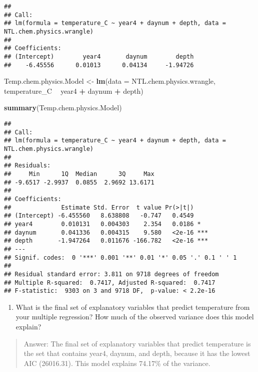 \documentclass[]{article}
\newenvironment{Shaded}{\begin{snugshade}}{\end{snugshade}}
\newcommand{\KeywordTok}[1]{\textcolor[rgb]{0.13,0.29,0.53}{\textbf{#1}}}
\newcommand{\DataTypeTok}[1]{\textcolor[rgb]{0.13,0.29,0.53}{#1}}
\newcommand{\StringTok}[1]{\textcolor[rgb]{0.31,0.60,0.02}{#1}}
\newcommand{\OperatorTok}[1]{\textcolor[rgb]{0.81,0.36,0.00}{\textbf{#1}}}
\newcommand{\NormalTok}[1]{#1}
\providecommand{\tightlist}{%
  \setlength{\itemsep}{0pt}\setlength{\parskip}{0pt}}
\begin{document}
\begin{verbatim}
## 
## Call:
## lm(formula = temperature_C ~ year4 + daynum + depth, data = NTL.chem.physics.wrangle)
## 
## Coefficients:
## (Intercept)        year4       daynum        depth  
##    -6.45556      0.01013      0.04134     -1.94726
\end{verbatim}

\begin{Shaded}
\begin{Highlighting}[]
\NormalTok{Temp.chem.physics.Model <-}\StringTok{ }\KeywordTok{lm}\NormalTok{(}\DataTypeTok{data =}\NormalTok{ NTL.chem.physics.wrangle, temperature_C }\OperatorTok{~}\StringTok{ }\NormalTok{year4 }\OperatorTok{+}\StringTok{ }\NormalTok{daynum }\OperatorTok{+}\StringTok{ }\NormalTok{depth)}

\KeywordTok{summary}\NormalTok{(Temp.chem.physics.Model)}
\end{Highlighting}
\end{Shaded}

\begin{verbatim}
## 
## Call:
## lm(formula = temperature_C ~ year4 + daynum + depth, data = NTL.chem.physics.wrangle)
## 
## Residuals:
##     Min      1Q  Median      3Q     Max 
## -9.6517 -2.9937  0.0855  2.9692 13.6171 
## 
## Coefficients:
##              Estimate Std. Error  t value Pr(>|t|)    
## (Intercept) -6.455560   8.638808   -0.747   0.4549    
## year4        0.010131   0.004303    2.354   0.0186 *  
## daynum       0.041336   0.004315    9.580   <2e-16 ***
## depth       -1.947264   0.011676 -166.782   <2e-16 ***
## ---
## Signif. codes:  0 '***' 0.001 '**' 0.01 '*' 0.05 '.' 0.1 ' ' 1
## 
## Residual standard error: 3.811 on 9718 degrees of freedom
## Multiple R-squared:  0.7417, Adjusted R-squared:  0.7417 
## F-statistic:  9303 on 3 and 9718 DF,  p-value: < 2.2e-16
\end{verbatim}

\begin{enumerate}
\def\labelenumi{\arabic{enumi}.}
\setcounter{enumi}{4}
\tightlist
\item
  What is the final set of explanatory variables that predict
  temperature from your multiple regression? How much of the observed
  variance does this model explain?
\end{enumerate}

\begin{quote}
Answer: The final set of explanatory variables that predict temperature
is the set that contains year4, daynum, and depth, because it has the
lowest AIC (26016.31). This model explains 74.17\% of the variance.
\end{quote}
\end{document}
